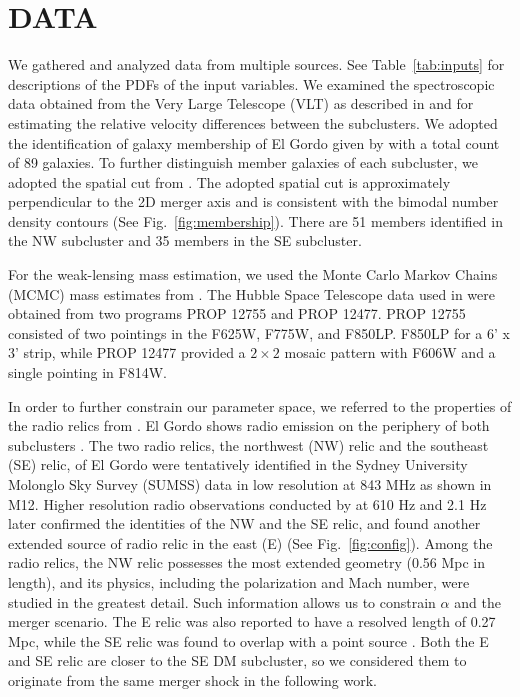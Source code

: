 \documentclass[ucdthesis.tex]{subfiles}
\begin{document}
    \section{DATA} 
    We gathered and analyzed data from multiple sources. 
    See Table~\ref{tab:inputs} for descriptions of the PDFs of the input
    variables. 
    We examined the
    spectroscopic data obtained from the Very Large Telescope (VLT) as described in  and \citet{Sifon13} for estimating the
    relative velocity differences between the subclusters.
    We adopted the identification of galaxy membership of El Gordo given by
    \citet{Sifon13} with a total count of 89 galaxies.
    To further distinguish member galaxies of each subcluster, we adopted the
    spatial cut from .
    The adopted spatial cut is approximately perpendicular to the 2D merger
    axis  and is consistent with
    the bimodal number density contours (See Fig.~\ref{fig:membership}). 
    There are 51 members identified in the NW subcluster and 35 members in the SE
    subcluster. \par 
    For the weak-lensing mass estimation, we used the
    Monte Carlo Markov Chains (MCMC) mass estimates from .
    The Hubble Space Telescope data used in  were obtained from two
    programs PROP 12755 and PROP 12477. PROP 12755 consisted of two pointings in the F625W, F775W, and F850LP.
    F850LP for a 6' x 3' strip, while PROP 12477 provided a $2 \times 2$ mosaic
    pattern with F606W and a single pointing in F814W. 
    \par 
    In order to further constrain our parameter space, we referred to the properties of
    the radio relics from \citet{L13}. El Gordo shows radio emission on the
    periphery of both subclusters . The two radio relics, the
    northwest (NW) relic and the southeast (SE) relic, of El Gordo were
    tentatively identified
    in the Sydney University Molonglo Sky Survey (SUMSS) data in low
    resolution at 843 MHz \citep{Mauch03} as shown in M12. Higher
    resolution radio observations conducted by \cite{L13} at 610 \mega Hz and
    2.1 \giga Hz later confirmed the identities of the NW and the SE relic, and
    found another extended source of radio relic in the east (E) (See Fig.~\ref{fig:config}). Among the radio relics, the NW relic possesses the most extended geometry
    (0.56 Mpc in length), and its physics, including the
    polarization and Mach number, were studied in the greatest detail. Such
    information allows us to constrain $\alpha$ and the merger scenario. The E relic
    was also reported to have a resolved length of 0.27 Mpc, while the SE relic
    was found to overlap with a point source \citep{L13}. Both the E and SE
    relic are closer to the SE DM subcluster, so we considered them to
    originate from the same merger shock in the following work.
\end{document}
